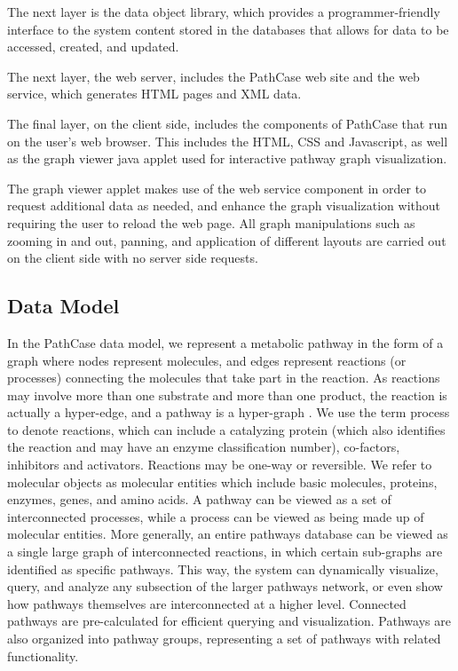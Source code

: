 The next layer is the data object library, which provides a programmer-friendly
interface to the system content stored in the databases that allows for data to
be accessed, created, and updated.

The next layer, the web server, includes the PathCase web site and the web
service, which generates HTML pages and XML data.

The final layer, on the client side, includes the components of PathCase that
run on the user’s web browser. This includes the HTML, CSS and Javascript, as
well as the graph viewer java applet used for interactive pathway graph
visualization.

The graph viewer applet makes use of the web service component in order to
request additional data as needed, and enhance the graph visualization without
requiring the user to reload the web page. All graph manipulations such as
zooming in and out, panning, and application of different layouts are carried
out on the client side with no server side requests.

\subsection{Data Model}
\label{sect:pathcase_data_model}

In the PathCase data model, we represent a metabolic pathway \cite{Michal-1999}
in the form of a graph where nodes represent molecules, and edges represent
reactions (or processes) connecting the molecules that take part in the
reaction. As reactions may involve more than one substrate and more than one
product, the reaction is actually a hyper-edge, and a pathway is a hyper-graph
\cite{Berge-1973}. We use the term process to denote reactions, which can
include a catalyzing protein (which also identifies the reaction and may have an
enzyme classification number), co-factors, inhibitors and activators. Reactions
may be one-way or reversible. We refer to molecular objects as molecular
entities which include basic molecules, proteins, enzymes, genes, and amino
acids. A pathway can be viewed as a set of interconnected processes, while a
process can be viewed as being made up of molecular entities. More generally, an
entire pathways database can be viewed as a single large graph of interconnected
reactions, in which certain sub-graphs are identified as specific pathways. This
way, the system can dynamically visualize, query, and analyze any subsection of
the larger pathways network, or even show how pathways themselves are
interconnected at a higher level. Connected pathways are pre-calculated for
efficient querying and visualization. Pathways are also organized into pathway
groups, representing a set of pathways with related functionality. 

